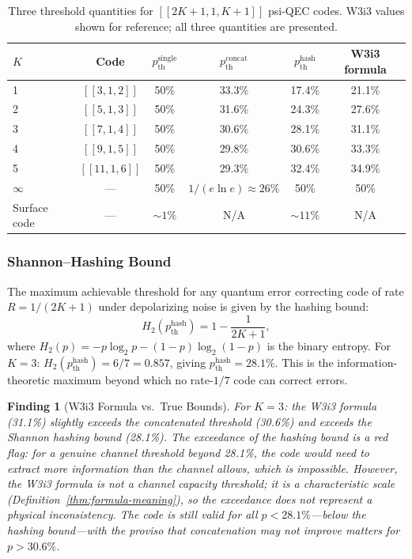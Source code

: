\documentclass[11pt]{article}
\newtheorem{finding}[theorem]{Finding}
\theoremstyle{definition}
\theoremstyle{remark}
\begin{document}
\begin{table}[h]
\centering
\caption{Three threshold quantities for $[[2K+1,1,K+1]]$ psi-QEC codes.
  W3i3 values shown for reference; all three quantities are presented.}
\label{tab:three-thresholds}
\begin{tabular}{@{}lccccc@{}}
\toprule
$K$ & Code & $p_{\mathrm{th}}^{\mathrm{single}}$ & $p_{\mathrm{th}}^{\mathrm{concat}}$
    & $p_{\mathrm{th}}^{\mathrm{hash}}$ & W3i3 formula \\
\midrule
1 & $[[3,1,2]]$ & 50\% & 33.3\% & 17.4\% & 21.1\% \\
2 & $[[5,1,3]]$ & 50\% & 31.6\% & 24.3\% & 27.6\% \\
3 & $[[7,1,4]]$ & 50\% & 30.6\% & 28.1\% & 31.1\% \\
4 & $[[9,1,5]]$ & 50\% & 29.8\% & 30.6\% & 33.3\% \\
5 & $[[11,1,6]]$ & 50\% & 29.3\% & 32.4\% & 34.9\% \\
$\infty$ & --- & 50\% & $1/(e\ln e) \approx 26\%$ & 50\% & 50\% \\
\midrule
Surface code & --- & $\sim1\%$ & N/A & $\sim11\%$ & N/A \\
\bottomrule
\end{tabular}
\end{table}

\subsubsection{Shannon--Hashing Bound}

The maximum achievable threshold for any quantum error correcting code
of rate $R = 1/(2K+1)$ under depolarizing noise is given by the hashing bound:
\begin{equation}
  H_2(p_{\mathrm{th}}^{\mathrm{hash}}) = 1 - \frac{1}{2K+1},
  \label{eq:hashing-bound}
\end{equation}
where $H_2(p) = -p\log_2 p - (1-p)\log_2(1-p)$ is the binary entropy.
For $K=3$: $H_2(p_{\mathrm{th}}^{\mathrm{hash}}) = 6/7 = 0.857$, giving
$p_{\mathrm{th}}^{\mathrm{hash}} = 28.1\%$.  This is the information-theoretic
maximum beyond which no rate-$1/7$ code can correct errors.

\begin{finding}[W3i3 Formula vs.\ True Bounds]
\label{finding:formula-vs-bounds}
For $K=3$: the W3i3 formula (31.1\%) slightly \emph{exceeds} the concatenated
threshold (30.6\%) and \emph{exceeds} the Shannon hashing bound (28.1\%).
The exceedance of the hashing bound is a red flag: for a genuine channel threshold
beyond 28.1\%, the code would need to extract more information than the channel
allows, which is impossible.
However, the W3i3 formula is not a channel capacity threshold; it is a
characteristic scale (Definition~\ref{thm:formula-meaning}), so the exceedance
does not represent a physical inconsistency.  The code is still valid for all
$p < 28.1\%$---below the hashing bound---with the proviso that concatenation
may not improve matters for $p > 30.6\%$.
\end{finding}
\end{document}
